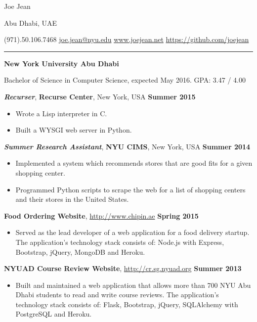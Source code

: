 \documentclass[11pt]{article} %
\begin{document}
\centerline{{\Huge \sc Joe Jean}}  %
\centerline{Abu Dhabi, UAE}
\centerline{(971).50.106.7468 \textbar \hspace{2pt}\href{mailto:joe.jean@nyu.edu}{joe.jean@nyu.edu} \textbar \hspace{2pt}\url{www.joejean.net} \textbar \hspace{2pt}\url{https://github.com/joejean} } 
\noindent
\rule{\textwidth}{1pt}\bigskip

\medskip

\noindent \centerline{\normalsize \bf New York University Abu Dhabi \hfill }
Bachelor of Science in Computer Science, expected May 2016. GPA: 3.47 / 4.00\\

 \medskip

\noindent \centerline{\large \textbf{\textit{Recurser}}, \textbf {Recurse Center}, New York, USA \hfill \textbf{Summer 2015}}
\begin{itemize}\itemsep0em
  \item Wrote a Lisp interpreter in C. 
  \item Built a WYSGI web server in Python.
\end{itemize}
\noindent \centerline{\large \textbf{\textit{Summer Research Assistant}}, \textbf {NYU CIMS}, New York, USA \hfill \textbf{Summer 2014}}
\begin{itemize}\itemsep0em
  \item Implemented a system which recommends stores that are good fits for a given shopping center.
  \item Programmed Python scripts to scrape the web for a list of shopping centers and their stores in the United States.
\end{itemize}
\medskip

\medskip

\noindent \centerline{\normalsize \textbf{Food Ordering Website}, \url{http://www.chipin.ae} \hfill \textbf{Spring 2015}}
\begin{itemize}
  \item Served as the lead developer of a web application for a food delivery startup. The application's technology stack consists of: Node.js with Express, Bootstrap, jQuery, MongoDB and Heroku.
\end{itemize}
\noindent \centerline{\normalsize \textbf{NYUAD Course Review Website}, \url{http://cr.sg.nyuad.org} \hfill \textbf{Summer 2013}}
\begin{itemize}\itemsep0em
  \item Built and maintained a web application that allows more than 700 NYU Abu Dhabi students to read and write course reviews. The application's technology stack consists of: Flask, Bootstrap, jQuery, SQLAlchemy with PostgreSQL and Heroku.
\end{itemize}
\medskip
\end{document}
